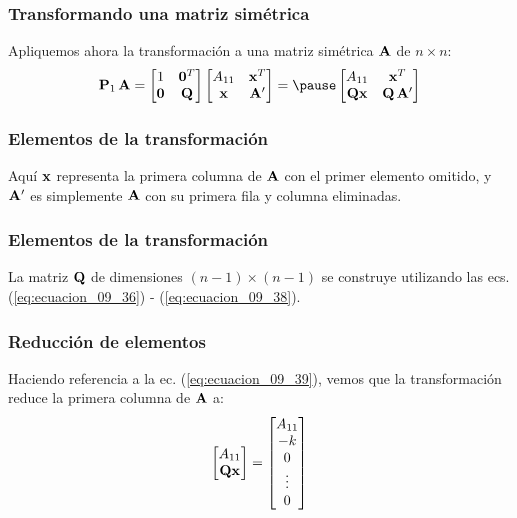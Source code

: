 \documentclass[12pt]{beamer}
\begin{document}
\begin{frame}
\frametitle{Transformando una matriz simétrica}
Apliquemos ahora la transformación a una matriz simétrica $\vb{A}$ de $n \times n$:
\pause
\begin{eqnarray}
\begin{aligned}
\vb{P}_{1} \, \vb{A} = 
\begin{bmatrix}
1 & \vb{0}^{T} \\
\vb{0} & \vb{Q}
\end{bmatrix}
\begin{bmatrix}
A_{11} & \vb{x}^{T} \\
\vb{x} & \pderivada{\vb{A}}
\end{bmatrix}
= \pause
\begin{bmatrix}
A_{11} & \vb{x}^{T} \\
\vb{Q x} & \vb{Q} \, \pderivada{\vb{A}}
\end{bmatrix}
\end{aligned}
\label{eq:ecuacion_09_40}
\end{eqnarray}
\end{frame}
\begin{frame}
\frametitle{Elementos de la transformación}
Aquí $\vb{x}$ representa la primera columna de $\vb{A}$ con el primer elemento omitido, \pause y ${\vb{A}}^{\prime}$ es simplemente $\vb{A}$ con su primera fila y columna eliminadas.
\end{frame}
\begin{frame}
\frametitle{Elementos de la transformación}
La matriz $\vb{Q}$ de dimensiones $(n - 1) \times (n - 1)$ se construye utilizando las ecs. (\ref{eq:ecuacion_09_36}) - (\ref{eq:ecuacion_09_38}). 
\end{frame}
\begin{frame}
\frametitle{Reducción de elementos}
Haciendo referencia a la ec. (\ref{eq:ecuacion_09_39}), vemos que la transformación reduce la primera columna de $\vb{A}$ a:
\pause
\renewcommand{\arraystretch}{1}
\begin{align*}
\begin{bmatrix}
A_{11} \\
\vb{Q x}
\end{bmatrix}
=
\begin{bmatrix}
A_{11} \\
-k \\
0 \\
\vdots \\
0
\end{bmatrix}
\end{align*}
\end{frame}
\end{document}
